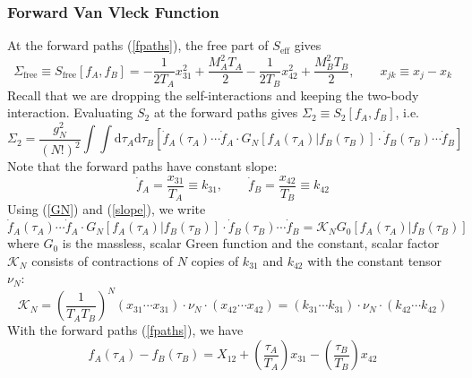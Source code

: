 \subsubsection{Forward Van Vleck Function}
At the forward paths (\ref{fpaths}), the free part of $S_{\text{eff}}$ gives
\begin{equation}
	\Sigma_{\text{free}} \equiv S_{\text{free}}[f_{A}, f_{B}] = - \frac{1}{2 T_{A}} x_{3 1}^{2} + \frac{M_{A}^{2} T_{A}}{2} - \frac{1}{2 T_{B}} x_{4 2}^{2} + \frac{M_{B}^{2} T_{B}}{2}, \qquad x_{jk} \equiv x_{j} - x_{k} \label{SigFree}
\end{equation}
Recall that we are dropping the self-interactions and keeping the two-body interaction. Evaluating $S_{2}$ at the forward paths gives $\Sigma_{2} \equiv S_{2}[f_{A}, f_{B}]$, i.e. 
\begin{equation}
	\Sigma_{2} = \frac{g_{N}^{2}}{(N!)^{2}} \int \int \mathrm{d}\tau_{A} \mathrm{d}\tau_{B} \left[ \dot{f}_{A}(\tau_{A}) \cdots \dot{f}_{A} \cdot G_{N}[f_{A}(\tau_{A}) | f_{B}(\tau_{B})] \cdot \dot{f}_{B}(\tau_{B}) \cdots \dot{f}_{B} \right]
\end{equation}
Note that the forward paths have constant slope:
\begin{equation}
	\dot{f}_{A} = \frac{x_{31}}{T_{A}} \equiv k_{31}, \qquad \dot{f}_{B} = \frac{x_{42}}{T_{B}} \equiv k_{42} \label{slope}
\end{equation}
Using (\ref{GN}) and (\ref{slope}), we write
\begin{equation}
	\dot{f}_{A}(\tau_{A}) \cdots \dot{f}_{A} \cdot G_{N}[f_{A}(\tau_{A}) | f_{B}(\tau_{B})] \cdot \dot{f}_{B}(\tau_{B}) \cdots \dot{f}_{B} = \mathcal{K}_{N} G_{0}[f_{A}(\tau_{A}) | f_{B}(\tau_{B})]
\end{equation}
where $G_{0}$ is the massless, scalar Green function and the constant, scalar factor $\mathcal{K}_{N}$ consists of contractions of $N$ copies of $k_{3 1}$ and $k_{4 2}$ with the constant tensor $\nu_{N}$:
\begin{equation}
	\mathcal{K}_{N} = \left( \frac{1}{T_{A} T_{B}} \right)^{N} \left(x_{3 1} \cdots x_{3 1} \right) \cdot \nu_{N} \cdot \left(x_{4 2} \cdots x_{4 2}\right) = \left(k_{3 1} \cdots k_{3 1} \right) \cdot \nu_{N} \cdot \left(k_{4 2} \cdots k_{4 2}\right)
\end{equation}
With the forward paths (\ref{fpaths}), we have
\begin{equation}
	f_{A}(\tau_{A}) - f_{B}(\tau_{B}) = X_{1 2} + \left( \frac{\tau_{A}}{T_{A}} \right) x_{3 1} - \left( \frac{\tau_{B}}{T_{B}} \right) x_{4 2}
\end{equation}
